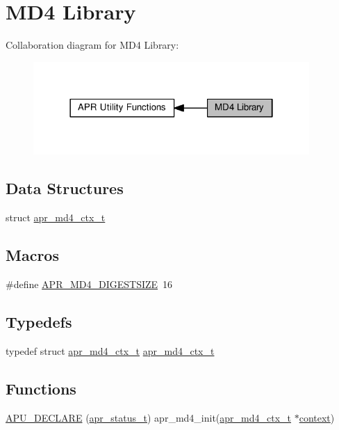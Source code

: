 \hypertarget{group__APR__Util__MD4}{}\section{M\+D4 Library}
\label{group__APR__Util__MD4}
Collaboration diagram for M\+D4 Library\+:
\nopagebreak
\begin{figure}[H]
\begin{center}
\leavevmode
\includegraphics[width=298pt]{group__APR__Util__MD4}
\end{center}
\end{figure}
\subsection*{Data Structures}
\begin{DoxyCompactItemize}
\item 
struct \hyperlink{structapr__md4__ctx__t}{apr\+\_\+md4\+\_\+ctx\+\_\+t}
\end{DoxyCompactItemize}
\subsection*{Macros}
\begin{DoxyCompactItemize}
\item 
\#define \hyperlink{group__APR__Util__MD4_ga84489272090a11902d831c288c81c20f}{A\+P\+R\+\_\+\+M\+D4\+\_\+\+D\+I\+G\+E\+S\+T\+S\+I\+ZE}~16
\end{DoxyCompactItemize}
\subsection*{Typedefs}
\begin{DoxyCompactItemize}
\item 
typedef struct \hyperlink{structapr__md4__ctx__t}{apr\+\_\+md4\+\_\+ctx\+\_\+t} \hyperlink{group__APR__Util__MD4_ga273e0d8ad064dba908e46bde074af0d8}{apr\+\_\+md4\+\_\+ctx\+\_\+t}
\end{DoxyCompactItemize}
\subsection*{Functions}
\begin{DoxyCompactItemize}
\item 
\hyperlink{group__APR__Util__MD4_gaa63483c91453cbeabf584102fba6d0e1}{A\+P\+U\+\_\+\+D\+E\+C\+L\+A\+RE} (\hyperlink{group__apr__errno_gaa5105fa83cc322f09382292db8b47593}{apr\+\_\+status\+\_\+t}) apr\+\_\+md4\+\_\+init(\hyperlink{structapr__md4__ctx__t}{apr\+\_\+md4\+\_\+ctx\+\_\+t} $\ast$\hyperlink{pcregrep_8txt_a651ed26971b1d49911883c4eb87db1ad}{context})
\end{DoxyCompactItemize}

